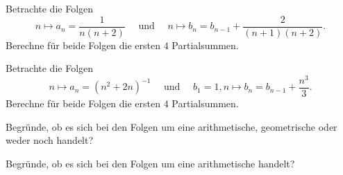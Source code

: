 \documentclass[11pt]{exam}
\begin{document}
\begin{questions}
\noaddpoints
\question[\totalpoints]
\addpoints
{}

\question[6] %
Betrachte die Folgen
\[n\mapsto a_n=\frac{1}{n(n+2)} \quad\text{ und }\quad n\mapsto b_n=b_{n-1}+\frac{2}{(n+1)(n+2)}.\]
Berechne für beide Folgen die ersten $4$ Partialsummen.

\question[6]
Betrachte die Folgen
\[n\mapsto a_n=(n^2+2n)^{-1} \quad\text{ und }\quad b_1=1, n\mapsto b_n=b_{n-1}+\frac{n^3}{3}.\]
Berechne für beide Folgen die ersten $4$ Partialsummen.

\noaddpoints
\question[\totalpoints] %
\addpoints
Begründe, ob es sich bei den Folgen um eine arithmetische, geometrische oder weder noch handelt?


\noaddpoints
\question[\totalpoints]
\addpoints
Begründe, ob es sich bei den Folgen um eine arithmetische handelt?
\begin{parts}

\end{parts}
\end{questions}
\end{document}
